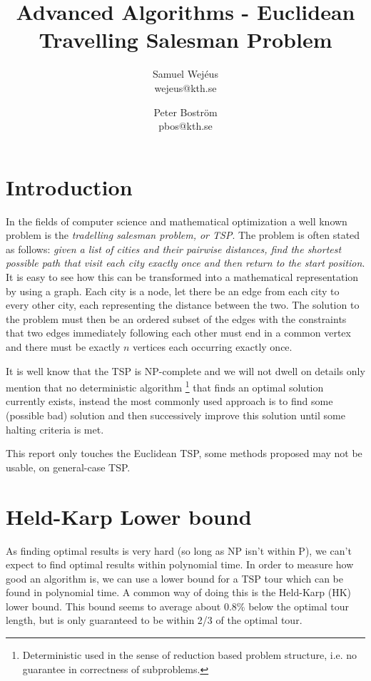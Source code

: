 \documentclass[a4paper,12pt,oneside]{article}
\title{Advanced Algorithms - Euclidean Travelling Salesman Problem}
\author{Samuel Wej\'eus \\ \lowercase{wejeus@kth.se} \and Peter Boström \\ \lowercase{pbos@kth.se} }
\begin{document}
\maketitle

\section{Introduction}
In the fields of computer science and mathematical optimization a well known problem is the \textit{tradelling salesman problem, or TSP}. The problem is often stated as follows: \textit{given a list of cities and their pairwise distances, find the shortest possible path that visit each city exactly once and then return to the start position}. It is easy to see how this can be transformed into a mathematical representation by using a graph. Each city is a node, let there be an edge from each city to every other city, each representing the distance between the two. The solution to the problem must then be an ordered subset of the edges with the constraints that two edges immediately following each other must end in a common vertex and there must be exactly $n$ vertices each occurring exactly once.

It is well know that the TSP is NP-complete and we will not dwell on details only mention that no deterministic algorithm \footnote{Deterministic used in the sense of reduction based problem structure, i.e. no guarantee in correctness of subproblems.} that finds an optimal solution currently exists, instead the most commonly used approach is to find some (possible bad) solution and then successively improve this solution until some halting criteria is met.

This report only touches the Euclidean TSP, some methods proposed may not be usable, on general-case TSP.

\section{Held-Karp Lower bound}

As finding optimal results is very hard (so long as NP isn't within P), we can't expect to find optimal results within polynomial time. In order to measure how good an algorithm is, we can use a lower bound for a TSP tour which can be found in polynomial time. A common way of doing this is the Held-Karp (HK) lower bound. This bound seems to average about 0.8\% below the optimal tour length, but is only guaranteed to be within 2/3 of the optimal tour. 
\end{document}
